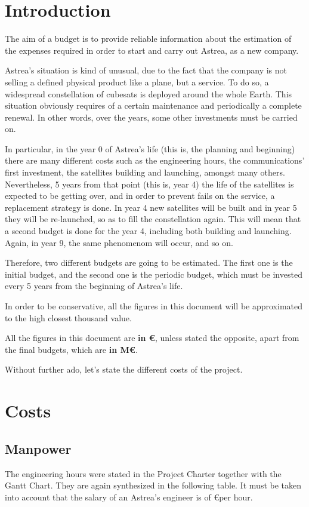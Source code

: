 \chapter{Introduction}
The aim of a budget is to provide reliable information about the estimation of the expenses required in order to start and carry out Astrea, as a new company.

Astrea's situation is kind of unusual, due to the fact that the company is not selling a defined physical product like a plane, but a service. To do so, a widespread constellation of cubesats is deployed around the whole Earth. This situation obviously requires of a certain maintenance and periodically a complete renewal. In other words, over the years, some other investments must be carried on. 

In particular, in the year 0 of Astrea's life (this is, the planning and beginning) there are many different costs such as the engineering hours, the communications' first investment, the satellites building and launching, amongst many others. Nevertheless, 5 years from that point (this is, year 4) the life of the satellites is expected to be getting over, and in order to prevent fails on the service, a replacement strategy is done. In year 4 new satellites will be built and in year 5 they will be re-launched, so as to fill the constellation again. This will mean that a second budget is done for the year 4, including both building and launching. Again, in year 9, the same phenomenom will occur, and so on. 

Therefore, two different budgets are going to be estimated. The first one is the initial budget, and the second one is the periodic budget, which must be invested every 5 years from the beginning of Astrea's life.  

In order to be conservative, all the figures in this document will be approximated to the high closest thousand value. 

All the figures in this document are \textbf{in \euro}, unless stated the opposite, apart from the final budgets, which are \textbf{in M\euro}. 

Without further ado, let's state the different costs of the project.


\chapter{Costs}
\section{Manpower}
The engineering hours were stated in the Project Charter together with the Gantt Chart. They are again synthesized in the following table. It must be taken into account that the salary of an Astrea's engineer is of \euro  per hour. 

